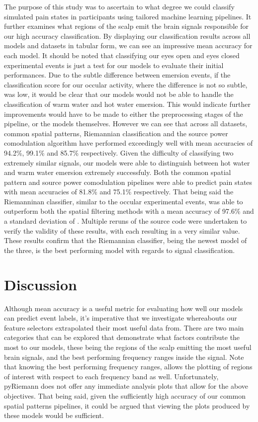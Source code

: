 \documentclass[11pt]{article}
\begin{document}
The purpose of this study was to ascertain to what degree we could classify simulated pain states in participants using tailored machine learning pipelines. It further examines what regions of the scalp emit the brain signals responsible for our high accuracy classification. By displaying our classification results across all models and datasets in tabular form, we can see an impressive mean accuracy for each model. It should be noted that classifying our eyes open and eyes closed experimental events is just a test for our models to evaluate their initial performances. Due to the subtle difference between emersion events, if the classification score for our occular activity, where the difference is not so subtle, was low, it would be clear that our models would not be able to handle the classification of warm water and hot water emersion. This would indicate further improvements would have to be made to either the preprocessing stages of the pipeline, or the models themselves. However we can see that across all datasets, common spatial patterns, Riemannian classification and the source power comodulation algorithm have performed exceedingly well with mean accuracies of 94.2\%, 99.1\% and 85.7\% respectively. Given the difficulty of classifying two extremely similar signals, our models were able to distinguish between hot water and warm water emersion extremely successfuly. Both the common spatial pattern and source power comodulation pipelines were able to predict pain states with mean accuracies of 81.8\% and 75.1\% respectively. That being said the Riemanninan classifier, similar to the occular experimental events, was able to outperform both the spatial filtering methods with a mean accuracy of 97.6\% and a standard deviation of . Multiple reruns of the source code were undertaken to verify the validity of these results, with each resulting in a very similar value. These results confirm that the Riemannian classifier, being the newest model of the three, is the best performing model with regards to signal classification.

\section{Discussion}

Although mean accuracy is a useful metric for evaluating how well our models can predict event labels, it's imperative that we investigate whereabouts our feature selectors extrapolated their most useful data from. There are two main categories that can be explored that demonstrate what factors contribute the most to our models, these being the regions of the scalp emitting the most useful brain signals, and the best performing frequency ranges inside the signal. Note that knowing the best performing frequency ranges, allows the plotting of regions of interest with respect to each frequency band as well. Unfortunately, pyRiemann does not offer any immediate analysis plots that allow for the above objectives. That being said, given the sufficiently high accuracy of our common spatial patterns pipelines, it could be argued that viewing the plots produced by these models would be sufficient. 
\end{document}
